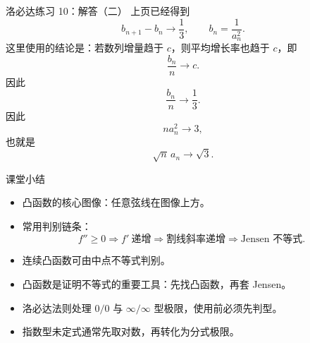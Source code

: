 \documentclass[aspectratio=169,11pt]{ctexbeamer}
\begin{document}
\begin{frame}{洛必达练习 10：解答（二）}
\small
上页已经得到
\[
  b_{n+1}-b_n\to \frac13,\qquad b_n=\frac1{a_n^2}.
\]
这里使用的结论是：若数列增量趋于 $c$，则平均增长率也趋于 $c$，即
\[
  \frac{b_n}{n}\to c.
\]
因此
\[
  \frac{b_n}{n}\to\frac13.
\]
因此
\[
  n a_n^2\to3,
\]
也就是
\[
  \sqrt n\,a_n\to\sqrt3.
\]
\end{frame}

\begin{frame}{课堂小结}
\begin{itemize}
  \item 凸函数的核心图像：任意弦线在图像上方。
  \item 常用判别链条：
  \[
    f''\ge0 \Rightarrow f'\ \text{递增}
    \Rightarrow \text{割线斜率递增}
    \Rightarrow \text{Jensen 不等式}.
  \]
  \item 连续凸函数可由中点不等式判别。
  \item 凸函数是证明不等式的重要工具：先找凸函数，再套 Jensen。
  \item 洛必达法则处理 $0/0$ 与 $\infty/\infty$ 型极限，使用前必须先判型。
  \item 指数型未定式通常先取对数，再转化为分式极限。
\end{itemize}
\end{frame}
\end{document}
